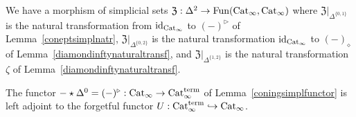 \documentclass{tac}
\newcommand{\f}[1]{\mathfrak{#1}}
\newcommand{\maybehat}[1]{#1} %
\newcommand{\tx}[1]{\textnormal{#1}}
\begin{document}
\begin{lemma}\label{frakztriangle} We have a morphism of simplicial sets $\f{Z}: \Delta^2 \to \tx{Fun}(\tx{Cat}_\infty , \tx{Cat}_\infty )$ where $\f{Z} |_{\Delta^{\{0,1 \}}}$ is the natural transformation from $\tx{id}_{\tx{Cat}_\infty}$ to  $(-)^\triangleright$ of Lemma~\ref{coneptsimplnatr},  $\f{Z} |_{\Delta^{\{0,2 \}}}$ is the natural transformation $\tx{id}_{\tx{Cat}_\infty}$ to $(-)_\diamond$ of Lemma~\ref{diamondinftynaturaltransf}, and $\f{Z} |_{\Delta^{\{1,2 \}}}$ is the natural transformation $\zeta$ of Lemma~\ref{diamondinftynaturaltransf}.
\end{lemma}
\begin{proposition}\label{catptadj} The functor $-\star \Delta^0 = (-)^\triangleright : \maybehat{\tx{Cat}}_\infty \to \maybehat{\tx{Cat}}_\infty^\tx{term}$ of Lemma~\ref{coningsimplfunctor} is left adjoint to the forgetful functor $U:\maybehat{\tx{Cat}}_\infty^\tx{term} \hookrightarrow \maybehat{\tx{Cat}}_\infty$.
\end{proposition}
\end{document}
